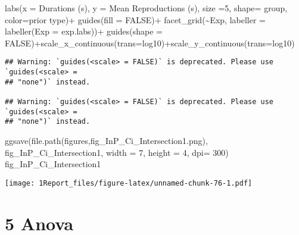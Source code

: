 \documentclass[
]{article}
\newenvironment{Shaded}{\begin{snugshade}}{\end{snugshade}}
\newcommand{\AttributeTok}[1]{\textcolor[rgb]{0.77,0.63,0.00}{#1}}
\newcommand{\ConstantTok}[1]{\textcolor[rgb]{0.00,0.00,0.00}{#1}}
\newcommand{\DecValTok}[1]{\textcolor[rgb]{0.00,0.00,0.81}{#1}}
\newcommand{\FunctionTok}[1]{\textcolor[rgb]{0.00,0.00,0.00}{#1}}
\newcommand{\NormalTok}[1]{#1}
\newcommand{\SpecialCharTok}[1]{\textcolor[rgb]{0.00,0.00,0.00}{#1}}
\newcommand{\StringTok}[1]{\textcolor[rgb]{0.31,0.60,0.02}{#1}}
\begin{document}
\begin{Shaded}
\begin{Highlighting}[]
  \FunctionTok{labs}\NormalTok{(}\AttributeTok{x =} \StringTok{\textquotesingle{}Durations (s)\textquotesingle{}}\NormalTok{, }\AttributeTok{y =} \StringTok{\textquotesingle{}Mean Reproductions (s)\textquotesingle{}}\NormalTok{, }\AttributeTok{size =}\DecValTok{5}\NormalTok{, }\AttributeTok{shape=} \StringTok{\textquotesingle{}group\textquotesingle{}}\NormalTok{, }\AttributeTok{color=}\StringTok{\textquotesingle{}prior type\textquotesingle{}}\NormalTok{)}\SpecialCharTok{+} \FunctionTok{guides}\NormalTok{(}\AttributeTok{fill =} \ConstantTok{FALSE}\NormalTok{)}\SpecialCharTok{+} 
  \FunctionTok{facet\_grid}\NormalTok{(}\SpecialCharTok{\textasciitilde{}}\NormalTok{Exp, }\AttributeTok{labeller =} \FunctionTok{labeller}\NormalTok{(}\AttributeTok{Exp =}\NormalTok{ exp.labs))}\SpecialCharTok{+} \FunctionTok{guides}\NormalTok{(}\AttributeTok{shape =} \ConstantTok{FALSE}\NormalTok{)}\SpecialCharTok{+}\FunctionTok{scale\_x\_continuous}\NormalTok{(}\AttributeTok{trans=}\StringTok{\textquotesingle{}log10\textquotesingle{}}\NormalTok{)}\SpecialCharTok{+}\FunctionTok{scale\_y\_continuous}\NormalTok{(}\AttributeTok{trans=}\StringTok{\textquotesingle{}log10\textquotesingle{}}\NormalTok{)}
\end{Highlighting}
\end{Shaded}

\begin{verbatim}
## Warning: `guides(<scale> = FALSE)` is deprecated. Please use `guides(<scale> =
## "none")` instead.

## Warning: `guides(<scale> = FALSE)` is deprecated. Please use `guides(<scale> =
## "none")` instead.
\end{verbatim}

\begin{Shaded}
\begin{Highlighting}[]
\FunctionTok{ggsave}\NormalTok{(}\FunctionTok{file.path}\NormalTok{(}\StringTok{\textquotesingle{}figures\textquotesingle{}}\NormalTok{,}\StringTok{\textquotesingle{}fig\_InP\_Ci\_Intersection1.png\textquotesingle{}}\NormalTok{), fig\_InP\_Ci\_Intersection1, }\AttributeTok{width =} \DecValTok{7}\NormalTok{, }\AttributeTok{height =} \DecValTok{4}\NormalTok{, }\AttributeTok{dpi=} \DecValTok{300}\NormalTok{)}
\NormalTok{fig\_InP\_Ci\_Intersection1 }
\end{Highlighting}
\end{Shaded}

\texttt{[image: 1Report\_files/figure-latex/unnamed-chunk-76-1.pdf]}

\hypertarget{anova}{%
\section{5 Anova}\label{anova}}
\end{document}
